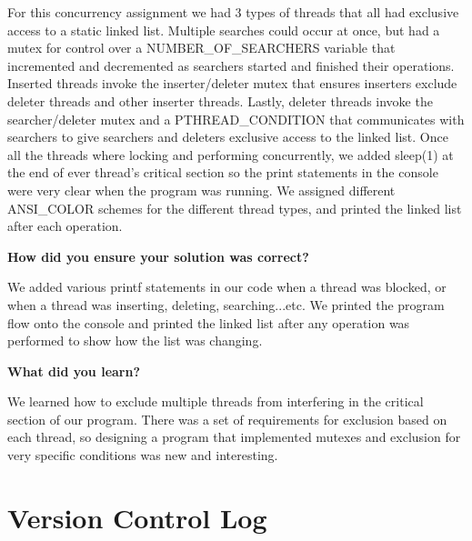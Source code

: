 \documentclass[10pt,letterpaper,draftclsnofoot,onecolumn]{IEEEtran}
\begin{document}
\noindent For this concurrency assignment we had 3 types of threads that all had exclusive access to a static linked list. Multiple searches could occur at once, but had a mutex for control over a NUMBER\_OF\_SEARCHERS variable that incremented and decremented as searchers started and finished their operations. Inserted threads invoke the inserter/deleter mutex that ensures inserters exclude deleter threads and other inserter threads. Lastly, deleter threads invoke the searcher/deleter mutex and a PTHREAD\_CONDITION that communicates with searchers to give searchers and deleters exclusive access to the linked list. Once all the threads where locking and performing concurrently, we added sleep(1) at the end of ever thread's critical section so the print statements in the console were very clear when the program was running. We assigned different ANSI\_COLOR schemes for the different thread types, and printed the linked list after each operation.

\bigskip

\noindent\textbf{How did you ensure your solution was correct?}
\medskip

\medskip

\noindent We added various printf statements in our code when a thread was blocked, or when a thread was inserting, deleting, searching...etc. We printed the program flow onto the console and printed the linked list after any operation was performed to show how the list was changing.
\bigskip

\noindent\textbf{What did you learn?}
\medskip

\medskip

\noindent We learned how to exclude multiple threads from interfering in the critical section of our program. There was a set of requirements for exclusion based on each thread, so designing a program that implemented mutexes and exclusion for very specific conditions was new and interesting.  
\medskip


\section{Version Control Log}
\bigskip
\end{document}
